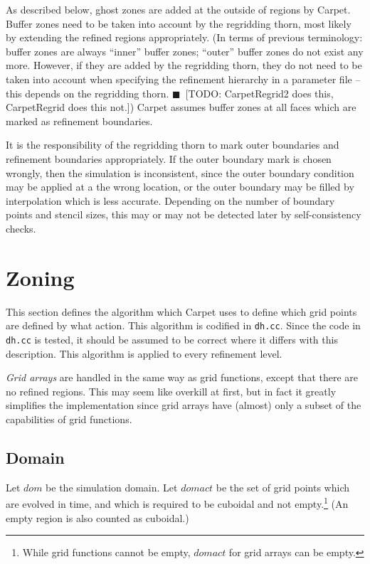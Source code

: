 \documentclass[oneside]{amsart}
\newcommand{\todo}[1]{{\color{blue}$\blacksquare$~\textsf{[TODO: #1]}}}
\newcommand{\code}[1]{\texttt{#1}}
\begin{document}
As described below, ghost zones are added at the outside of regions by
Carpet.  Buffer zones need to be taken into account by the regridding
thorn, most likely by extending the refined regions appropriately.
(In terms of previous terminology: buffer zones are always ``inner''
buffer zones; ``outer'' buffer zones do not exist any more.  However,
if they are added by the regridding thorn, they do not need to be
taken into account when specifying the refinement hierarchy in a
parameter file -- this depends on the regridding thorn.
\todo{CarpetRegrid2 does this, CarpetRegrid does this not.})  Carpet
assumes buffer zones at all faces which are marked as refinement
boundaries.

It is the responsibility of the regridding thorn to mark outer
boundaries and refinement boundaries appropriately.  If the outer
boundary mark is chosen wrongly, then the simulation is inconsistent,
since the outer boundary condition may be applied at a the wrong
location, or the outer boundary may be filled by interpolation which
is less accurate.  Depending on the number of boundary points and
stencil sizes, this may or may not be detected later by
self-consistency checks.



\section{Zoning}

This section defines the algorithm which Carpet uses to define which
grid points are defined by what action.  This algorithm is codified in
\code{dh.cc}.  Since the code in \code{dh.cc} is tested, it should be
assumed to be correct where it differs with this description.  This
algorithm is applied to every refinement level.

\emph{Grid arrays} are handled in the same way as grid functions,
except that there are no refined regions.  This may seem like overkill
at first, but in fact it greatly simplifies the implementation since
grid arrays have (almost) only a subset of the capabilities of grid
functions.

\subsection{Domain}

Let $dom$ be the simulation domain.  Let $domact$ be the set of grid
points which are evolved in time, and which is required to be cuboidal
and not empty.\footnote{While grid functions cannot be empty, $domact$
  for grid arrays can be empty.}  (An empty region is also counted as
cuboidal.)
\end{document}
